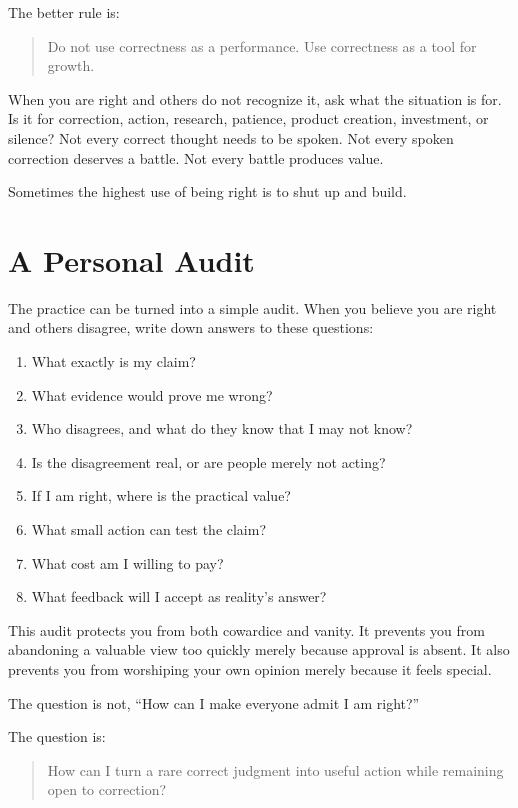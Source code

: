 The better rule is:

\begin{quote}
Do not use correctness as a performance. Use correctness as a tool for growth.
\end{quote}

When you are right and others do not recognize it, ask what the situation is for. Is it for correction, action, research, patience, product creation, investment, or silence? Not every correct thought needs to be spoken. Not every spoken correction deserves a battle. Not every battle produces value.

Sometimes the highest use of being right is to shut up and build.

\section*{A Personal Audit}

The practice can be turned into a simple audit. When you believe you are right and others disagree, write down answers to these questions:

\begin{enumerate}
\item What exactly is my claim?
\item What evidence would prove me wrong?
\item Who disagrees, and what do they know that I may not know?
\item Is the disagreement real, or are people merely not acting?
\item If I am right, where is the practical value?
\item What small action can test the claim?
\item What cost am I willing to pay?
\item What feedback will I accept as reality's answer?
\end{enumerate}

This audit protects you from both cowardice and vanity. It prevents you from abandoning a valuable view too quickly merely because approval is absent. It also prevents you from worshiping your own opinion merely because it feels special.

The question is not, ``How can I make everyone admit I am right?''

The question is:

\begin{quote}
How can I turn a rare correct judgment into useful action while remaining open to correction?
\end{quote}

